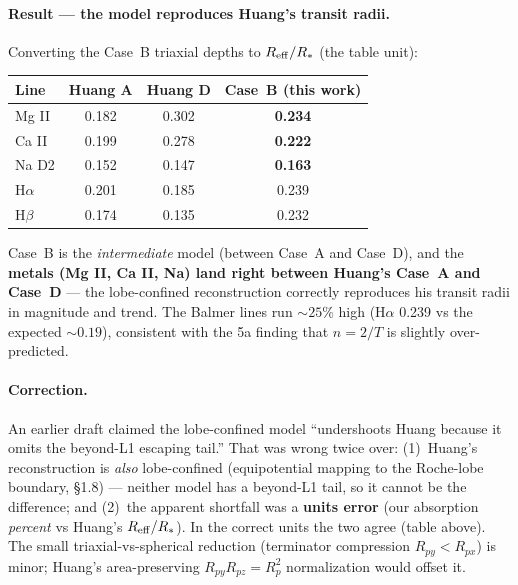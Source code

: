 \documentclass[english,a4paper]{kiseon_memo}
\begin{document}
\paragraph{Result --- the model reproduces Huang's transit radii.} Converting the Case~B
triaxial depths to \(R_{\rm eff}/R_*\) (the table unit):
\begin{center}\small
\begin{tabular}{lccc}
\hline
Line & Huang A & Huang D & Case~B (this work) \\
\hline
Mg II & 0.182 & 0.302 & \textbf{0.234} \\
Ca II & 0.199 & 0.278 & \textbf{0.222} \\
Na D2 & 0.152 & 0.147 & \textbf{0.163} \\
H\(\alpha\) & 0.201 & 0.185 & 0.239 \\
H\(\beta\) & 0.174 & 0.135 & 0.232 \\
\hline
\end{tabular}
\end{center}
Case~B is the \emph{intermediate} model (between Case~A and Case~D), and the \textbf{metals
(Mg II, Ca II, Na) land right between Huang's Case~A and Case~D} --- the lobe-confined
reconstruction correctly reproduces his transit radii in magnitude and trend. The Balmer
lines run \(\sim25\%\) high (H\(\alpha\) 0.239 vs the expected \(\sim0.19\)), consistent with
the 5a finding that \(n=2/T\) is slightly over-predicted.

\paragraph{Correction.} An earlier draft claimed the lobe-confined model ``undershoots Huang
because it omits the beyond-L1 escaping tail.'' That was wrong twice over: (1)~Huang's
reconstruction is \emph{also} lobe-confined (equipotential mapping to the Roche-lobe boundary,
\S1.8) --- neither model has a beyond-L1 tail, so it cannot be the difference; and (2)~the
apparent shortfall was a \textbf{units error} (our absorption \emph{percent} vs Huang's
\(R_{\rm eff}/R_*\)). In the correct units the two agree (table above). The small
triaxial-vs-spherical reduction (terminator compression \(R_{py}<R_{px}\)) is minor; Huang's
area-preserving \(R_{py}R_{pz}=R_p^2\) normalization would offset it.
\end{document}
